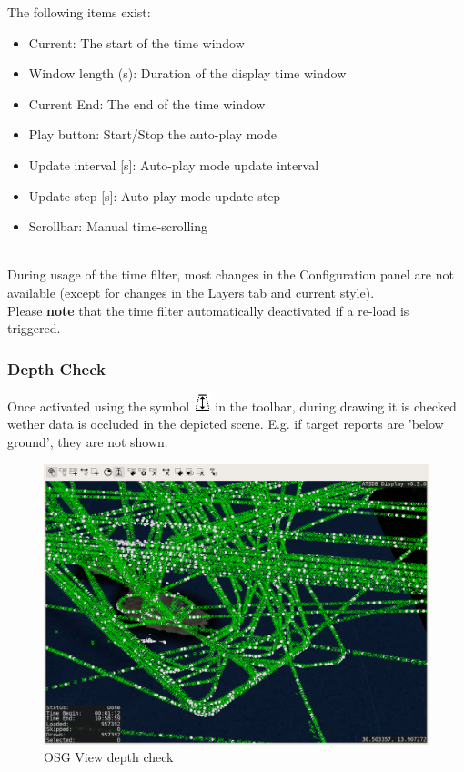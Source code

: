 The following items exist:

\begin{itemize}
 \item Current: The start of the time window
 \item Window length (s): Duration of the display time window
 \item Current End: The end of the time window
 \item Play button: Start/Stop the auto-play mode
 \item Update interval [s]: Auto-play mode update interval
 \item Update step [s]: Auto-play mode update step
 \item Scrollbar: Manual time-scrolling
\end{itemize}
\ \\

During usage of the time filter, most changes in the Configuration panel are not available (except for changes in the Layers tab and current style). \\

Please \textbf{note} that the time filter automatically deactivated if a re-load is triggered.

\subsubsection{Depth Check}

Once activated using the symbol \includegraphics[width=0.5cm,frame]{../../data/icons/depth.png} in the toolbar, during drawing it is checked wether data is occluded in the depicted scene. E.g. if target reports are 'below ground', they are not shown.

\begin{figure}[H]
    \hspace*{-2cm}
    \includegraphics[width=18cm,frame]{../screenshots/osgview_depth_check.png}
  \caption{OSG View depth check}
\end{figure}

